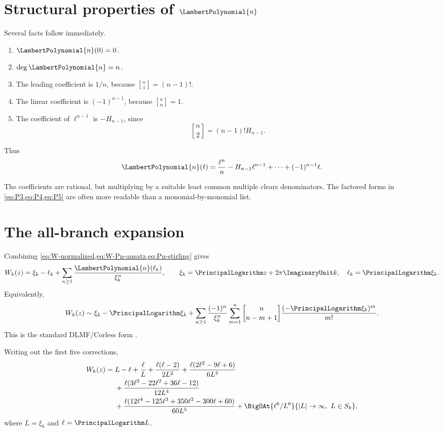\documentclass[11pt,openany]{book}
\theoremstyle{definition}
\theoremstyle{plain}
\theoremstyle{remark}
\newcommand{\stirlingone}[2]{\genfrac{[}{]}{0pt}{}{#1}{#2}}
\DeclareMathOperator{\polydeg}{deg}
\begin{document}
\section{Structural properties of \texorpdfstring{\(\LambertPolynomial{n}\)}{Pn}}
Several facts follow immediately.
\begin{enumerate}
\item \(\LambertPolynomial{n}(0)=0\).
\item \(\polydeg \LambertPolynomial{n}=n\).
\item The leading coefficient is \(1/n\), because \(\stirlingone{n}{1}=(n-1)!\).
\item The linear coefficient is \((-1)^{n-1}\), because \(\stirlingone{n}{n}=1\).
\item The coefficient of \(\ell^{n-1}\) is \(-H_{n-1}\), since
\[
 \stirlingone{n}{2}=(n-1)!H_{n-1}.
\]
\end{enumerate}
Thus
\begin{equation}\label{eq:Pn-edge-coefficients}
 \LambertPolynomial{n}(\ell)=\frac{\ell^n}{n}-H_{n-1}\ell^{n-1}
 +\cdots+(-1)^{n-1}\ell.
\end{equation}

The coefficients are rational, but multiplying by a suitable least common multiple clears denominators. The factored forms in \cref{eq:P3,eq:P4,eq:P5} are often more readable than a monomial-by-monomial list.

\section{The all-branch expansion}
Combining \cref{eq:W-normalized,eq:W-Pn-ansatz,eq:Pn-stirling} gives
\begin{equation}\label{eq:W-Pn-expansion}
 W_k(z)=\xi_k-\ell_k+
 \sum_{n\ge1}\frac{\LambertPolynomial{n}(\ell_k)}{\xi_k^n},
 \qquad
 \xi_k=\PrincipalLogarithm z+2\pi\ImaginaryUnit k,
 \quad \ell_k=\PrincipalLogarithm\xi_k.
\end{equation}
Equivalently,
\begin{equation}\label{eq:W-DLMF-form}
 W_k(z)\sim\xi_k-\PrincipalLogarithm\xi_k
 +\sum_{n\ge1}\frac{(-1)^n}{\xi_k^n}
 \sum_{m=1}^{n}
 \stirlingone{n}{n-m+1}
 \frac{(-\PrincipalLogarithm\xi_k)^m}{m!}.
\end{equation}
This is the standard DLMF/Corless form \cite{dlmf-W,corless-W,jeffrey-W}.

Writing out the first five corrections,
\begin{align}
 W_k(z)={}&L-\ell+\frac{\ell}{L}
 +\frac{\ell(\ell-2)}{2L^2}
 +\frac{\ell(2\ell^2-9\ell+6)}{6L^3}\notag\\
 &+\frac{\ell(3\ell^3-22\ell^2+36\ell-12)}{12L^4}\notag\\
 &+\frac{\ell(12\ell^4-125\ell^3+350\ell^2-300\ell+60)}{60L^5}
 +\BigOAt{\ell^6/L^6}{|L|\to\infty,\ L\in S_k},
\label{eq:W-five-corrections}
\end{align}
where \(L=\xi_k\) and \(\ell=\PrincipalLogarithm L\).
\end{document}
